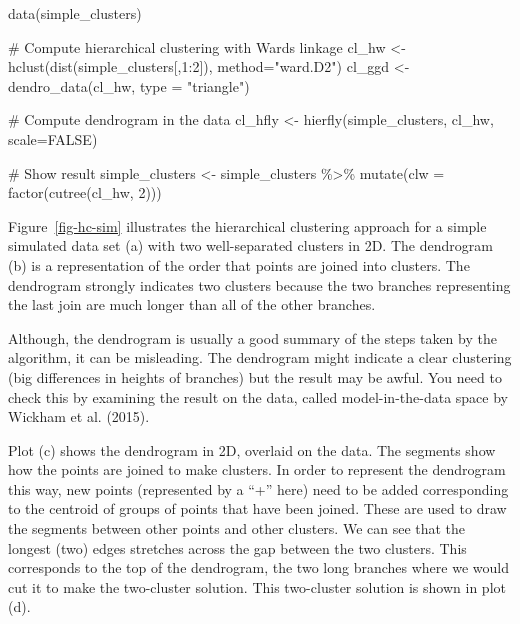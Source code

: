 \documentclass[
  letterpaper,
]{book}
\newenvironment{Shaded}{\begin{snugshade}}{\end{snugshade}}
\newcommand{\AttributeTok}[1]{\textcolor[rgb]{0.40,0.45,0.13}{#1}}
\newcommand{\CommentTok}[1]{\textcolor[rgb]{0.37,0.37,0.37}{#1}}
\newcommand{\ConstantTok}[1]{\textcolor[rgb]{0.56,0.35,0.01}{#1}}
\newcommand{\DecValTok}[1]{\textcolor[rgb]{0.68,0.00,0.00}{#1}}
\newcommand{\FunctionTok}[1]{\textcolor[rgb]{0.28,0.35,0.67}{#1}}
\newcommand{\NormalTok}[1]{\textcolor[rgb]{0.00,0.23,0.31}{#1}}
\newcommand{\OtherTok}[1]{\textcolor[rgb]{0.00,0.23,0.31}{#1}}
\newcommand{\SpecialCharTok}[1]{\textcolor[rgb]{0.37,0.37,0.37}{#1}}
\newcommand{\StringTok}[1]{\textcolor[rgb]{0.13,0.47,0.30}{#1}}
\begin{document}
\begin{Shaded}
\begin{Highlighting}[]
\FunctionTok{data}\NormalTok{(simple\_clusters)}

\CommentTok{\# Compute hierarchical clustering with Ward\textquotesingle{}s linkage}
\NormalTok{cl\_hw }\OtherTok{\textless{}{-}} \FunctionTok{hclust}\NormalTok{(}\FunctionTok{dist}\NormalTok{(simple\_clusters[,}\DecValTok{1}\SpecialCharTok{:}\DecValTok{2}\NormalTok{]),}
                \AttributeTok{method=}\StringTok{"ward.D2"}\NormalTok{)}
\NormalTok{cl\_ggd }\OtherTok{\textless{}{-}} \FunctionTok{dendro\_data}\NormalTok{(cl\_hw, }\AttributeTok{type =} \StringTok{"triangle"}\NormalTok{)}

\CommentTok{\# Compute dendrogram in the data}
\NormalTok{cl\_hfly }\OtherTok{\textless{}{-}} \FunctionTok{hierfly}\NormalTok{(simple\_clusters, cl\_hw, }\AttributeTok{scale=}\ConstantTok{FALSE}\NormalTok{)}

\CommentTok{\# Show result}
\NormalTok{simple\_clusters }\OtherTok{\textless{}{-}}\NormalTok{ simple\_clusters }\SpecialCharTok{\%\textgreater{}\%}
  \FunctionTok{mutate}\NormalTok{(}\AttributeTok{clw =} \FunctionTok{factor}\NormalTok{(}\FunctionTok{cutree}\NormalTok{(cl\_hw, }\DecValTok{2}\NormalTok{)))}
\end{Highlighting}
\end{Shaded}

Figure~\ref{fig-hc-sim} illustrates the hierarchical clustering approach
for a simple simulated data set (a) with two well-separated clusters in
2D. The dendrogram (b) is a representation of the order that points are
joined into clusters. The dendrogram strongly indicates two clusters
because the two branches representing the last join are much longer than
all of the other branches.

Although, the dendrogram is usually a good summary of the steps taken by
the algorithm, it can be misleading. The dendrogram might indicate a
clear clustering (big differences in heights of branches) but the result
may be awful. You need to check this by examining the result on the
data, called model-in-the-data space by Wickham et al. (2015).

Plot (c) shows the dendrogram in 2D, overlaid on the data. The segments
show how the points are joined to make clusters. In order to represent
the dendrogram this way, new points (represented by a ``+'' here) need
to be added corresponding to the centroid of groups of points that have
been joined. These are used to draw the segments between other points
and other clusters. We can see that the longest (two) edges stretches
across the gap between the two clusters. This corresponds to the top of
the dendrogram, the two long branches where we would cut it to make the
two-cluster solution. This two-cluster solution is shown in plot (d).
\end{document}
